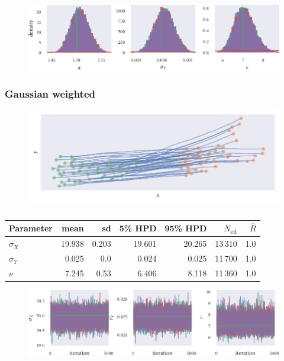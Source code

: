 \begin{figure}[tb]
    \includegraphics{stan_power_hist.pdf}
    \caption{}
\end{figure}

\subsubsection{Gaussian weighted}

\begin{figure}[tb]
    \includegraphics{gauss_sim.pdf}
    \caption{}
\end{figure}

\begin{table}[tb]
\begin{tabular}{@{}lrrrrrr@{}}
\toprule
Parameter &  mean &   sd & 5\% HPD & 95\% HPD & $N_{\textrm{eff}}$ & $\hat{R}$ \\
\midrule
$\sigma_{X}$ & 19.938 & 0.203 &  19.601 &   20.265 &            13\,310 &       1.0 \\
$\sigma_{Y}$ & 0.025 & 0.0 &   0.024 &    0.025 &            11\,700 &       1.0 \\
$\nu$ & 7.245 & 0.53 &   6.406 &    8.118 &            11\,360 &       1.0 \\
\bottomrule
\end{tabular}
\caption{}
\end{table}

\begin{figure}
    \includegraphics{stan_gauss_trace.pdf}
    \caption{}
\end{figure}

